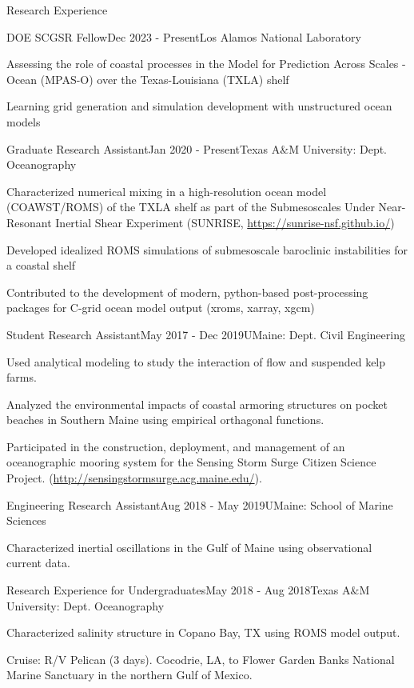 \documentclass{resume} %
\begin{document}
\begin{rSection}{Research Experience}
\begin{rSubsection}{DOE SCGSR Fellow}{Dec 2023 - Present}{Los Alamos National Laboratory}{} 
\item Assessing the role of coastal processes in the Model for Prediction Across Scales - Ocean (MPAS-O) over the Texas-Louisiana (TXLA) shelf
\item Learning grid generation and simulation development with unstructured ocean models
\end{rSubsection}    
\begin{rSubsection}{Graduate Research Assistant}{Jan 2020 - Present}{Texas A$\&$M University: Dept. Oceanography}{} 
\item Characterized numerical mixing in a high-resolution ocean model (COAWST/ROMS) of the TXLA shelf as part of the Submesoscales Under Near-Resonant Inertial Shear Experiment (SUNRISE, \url{https://sunrise-nsf.github.io/})
\item Developed idealized ROMS simulations of submesoscale baroclinic instabilities for a coastal shelf
\item Contributed to the development of modern, python-based post-processing packages for C-grid ocean model output (xroms, xarray, xgcm)
\end{rSubsection}    

\begin{rSubsection}{Student Research Assistant}{May 2017 - Dec 2019}{UMaine: Dept. Civil Engineering}{} 
\item Used analytical modeling to study the interaction of flow and suspended kelp farms.  
\item Analyzed the environmental impacts of coastal armoring structures on pocket beaches in Southern Maine using empirical orthagonal functions.
\item Participated in the construction, deployment, and management of an oceanographic mooring system for the Sensing Storm Surge Citizen Science Project. (\url{http://sensingstormsurge.acg.maine.edu/}).
\end{rSubsection}

\begin{rSubsection}{Engineering Research Assistant}{Aug 2018 - May 2019}{UMaine: School of Marine Sciences}{}
\item Characterized inertial oscillations in the Gulf of Maine using observational current data.
\end{rSubsection}

\begin{rSubsection}{Research Experience for Undergraduates}{May 2018 - Aug 2018}{Texas A$\&$M University: Dept. Oceanography}{} 
\item Characterized salinity structure in Copano Bay, TX using ROMS model output.
\item Cruise: R/V Pelican (3 days). Cocodrie, LA, to Flower Garden Banks National Marine Sanctuary in the northern Gulf of Mexico.
\end{rSubsection} 
\end{rSection} 
\vspace{-3pt}
\end{document}
